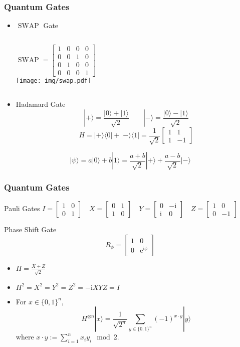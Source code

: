 \documentclass[UTF8,aspectratio=43,11pt,colorlinks,compress,openany]{beamer}%
\begin{document}
\begin{frame}\frametitle{Quantum Gates}
	\begin{itemize}
		\item $\operatorname{SWAP}$ Gate
		\begin{columns}
		\[\operatorname{SWAP} = \begin{bmatrix} 1&0&0&0\\0&0&1&0\\0&1&0&0\\0&0&0&1\end{bmatrix}\]
		\texttt{[image: img/swap.pdf]}
		\end{columns}
		\item Hadamard Gate
		\[|+\rangle=\frac{|0\rangle +|1\rangle}{\sqrt{2}}\qquad |-\rangle=\frac{|0\rangle -|1\rangle}{\sqrt{2}}\]
		\[H=|+\rangle\langle 0|+|-\rangle\langle 1| = \frac{1}{\sqrt{2}} \begin{bmatrix} 1 & 1 \\ 1 & -1 \end{bmatrix}\]
	\end{itemize}
	\[|\psi\rangle=a|0\rangle+b|1\rangle=\frac{a+b}{\sqrt{2}}|+\rangle+\frac{a-b}{\sqrt{2}}|-\rangle\]
\end{frame}

\begin{frame}\frametitle{Quantum Gates}
\setlength\abovedisplayskip{0pt}
\setlength\belowdisplayskip{0pt}
\begin{block}{Pauli Gates}
$I = \begin{bmatrix} 1 & 0 \\ 0 & 1\end{bmatrix}\quad
X = \begin{bmatrix} 0 & 1 \\ 1 & 0\end{bmatrix}\quad
Y = \begin{bmatrix} 0 & -\mathrm{i} \\ \mathrm{i} & 0\end{bmatrix}\quad
Z = \begin{bmatrix} 1 & 0 \\ 0 & -1\end{bmatrix}$
\end{block}
\begin{block}{Phase Shift Gate}
	\[R_{\phi}=
	\begin{bmatrix}
	1&0\\
	0&\mathrm{e}^{\mathrm{i}\phi}
	\end{bmatrix}\]
\end{block}
\begin{itemize}
	\item $H=\frac{X+Z}{\sqrt{2}}$
	\item $H^2=X^2=Y^2=Z^2=-\mathrm{i}XYZ=I$
	\item For $x\in\{0,1\}^n$,
\[H^{\otimes n}|x\rangle=\frac{1}{\sqrt{2^n}}\sum\limits_{y\in\{0,1\}^n}(-1)^{x\cdot y}|y\rangle\]
where $x\cdot y:=\sum\limits_{i=1}^n x_iy_i\mod 2$.
\end{itemize}
\end{frame}
\end{document}
